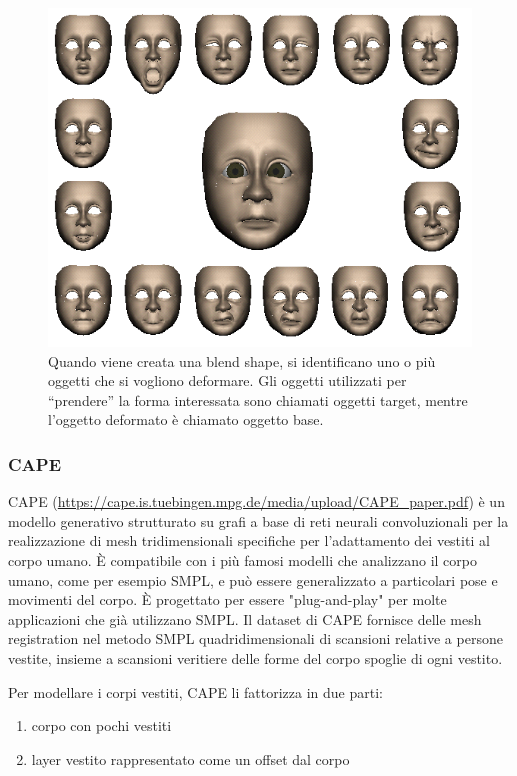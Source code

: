 \begin{figure}[ht!]
  \centering
  \includegraphics[scale=0.6]{Images/IntroductionPic/BlendShapes.png}
  \caption{Quando viene creata una blend shape, si identificano uno o più oggetti che si vogliono deformare. Gli oggetti utilizzati per “prendere” la forma interessata sono chiamati oggetti target, mentre l'oggetto deformato è chiamato oggetto base.}
  \label{fig:LBShape}
\end{figure}

\subsubsection{CAPE}

CAPE (\url{https://cape.is.tuebingen.mpg.de/media/upload/CAPE_paper.pdf}) è un modello generativo strutturato su grafi a base di reti neurali convoluzionali per la realizzazione di mesh tridimensionali specifiche per l’adattamento dei vestiti al corpo umano. È compatibile con i più famosi modelli che analizzano il corpo umano, come per esempio SMPL,  e può essere generalizzato a particolari pose e movimenti del corpo. È progettato per essere "plug-and-play" per molte applicazioni che già utilizzano SMPL.
Il dataset di CAPE fornisce delle mesh registration nel metodo SMPL quadridimensionali di scansioni relative a persone vestite, insieme a scansioni veritiere delle forme del corpo spoglie di ogni vestito.


\medskip

Per modellare i corpi vestiti, CAPE li fattorizza in due parti: 
\begin{enumerate}
\item corpo con pochi vestiti
\item layer vestito rappresentato come un offset dal corpo
\end{enumerate}

